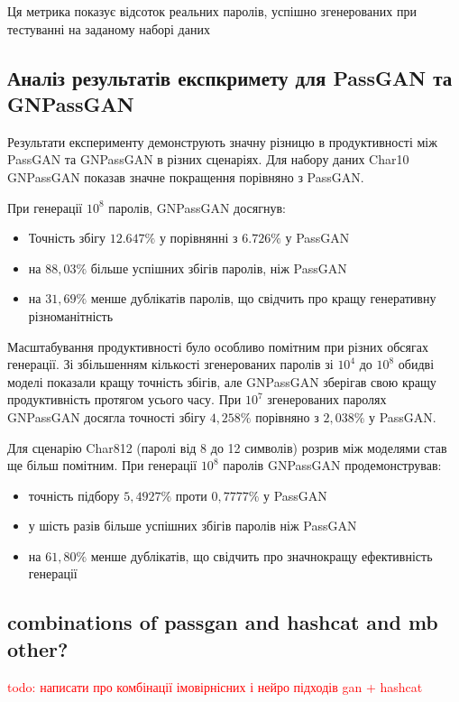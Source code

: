 Ця метрика показує відсоток реальних паролів, успішно згенерованих при тестуванні на заданому наборі даних

\subsection{Аналіз результатів експкримету для PassGAN та GNPassGAN}
Результати експерименту демонструють значну різницю в продуктивності між PassGAN та GNPassGAN в різних сценаріях. Для набору даних Char10 GNPassGAN показав значне покращення порівняно з PassGAN.

При генерації \(10^{8}\) паролів, GNPassGAN досягнув:
\begin{itemize}
    \item Точність збігу \(12.647\%\) у порівнянні з \(6.726\%\) у PassGAN
    \item на \(88,03\%\) більше успішних збігів паролів, ніж PassGAN
    \item на \(31,69\%\) менше дублікатів паролів, що свідчить про кращу генеративну різноманітність
\end{itemize}

Масштабування продуктивності було особливо помітним при різних обсягах генерації. Зі збільшенням кількості згенерованих паролів зі \(10^{4}\) до \(10^{8}\) обидві моделі показали кращу точність збігів, але GNPassGAN зберігав свою кращу продуктивність протягом усього часу. При \(10^{7}\) згенерованих паролях GNPassGAN досягла точності збігу \(4,258\%\) порівняно з \(2,038\%\) у PassGAN.

Для сценарію Char812 (паролі від 8 до 12 символів) розрив між моделями став ще більш помітним. При генерації $10^{8}$ паролів GNPassGAN продемонстрував:
\begin{itemize}
    \item точність підбору \(5,4927\%\) проти \(0,7777\%\) у PassGAN
    \item у шість разів більше успішних збігів паролів ніж PassGAN
    \item на \(61,80\%\) менше дублікатів, що свідчить про значнокращу ефективність генерації
\end{itemize}

\subsection{combinations of passgan and hashcat and mb other?}
\textcolor{red}{todo: написати про комбінації імовірнісних і нейро підходів gan + hashcat}

